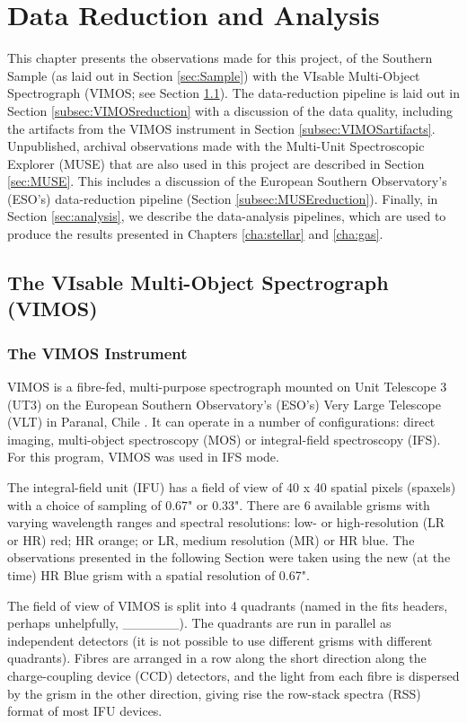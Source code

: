 \chapter{Data Reduction and Analysis}
	\label{cha:Data}
This chapter presents the observations made for this project, of the Southern Sample (as laid out in Section \ref{sec:Sample}) with the VIsable Multi-Object Spectrograph (VIMOS; see Section \ref{sec:VIMOS}). The data-reduction pipeline is laid out in Section \ref{subsec:VIMOSreduction} with a discussion of the data quality, including the artifacts from the VIMOS instrument in Section \ref{subsec:VIMOSartifacts}. Unpublished, archival observations made with the Multi-Unit Spectroscopic Explorer (MUSE) that are also used in this project are described in Section \ref{sec:MUSE}. This includes a discussion of the European Southern Observatory's (ESO's) data-reduction pipeline (Section \ref{subsec:MUSEreduction}). Finally, in Section \ref{sec:analysis}, we describe the data-analysis pipelines, which are used to produce the results presented in Chapters \ref{cha:stellar} and \ref{cha:gas}.  

\section{The VIsable Multi-Object Spectrograph (VIMOS)}
	\label{sec:VIMOS}
	\subsection{The VIMOS Instrument}
		VIMOS is a fibre-fed, multi-purpose spectrograph mounted on Unit Telescope 3 (UT3) on the European Southern Observatory's (ESO's) Very Large Telescope (VLT) in Paranal, Chile \citep{LeFevre2003}. It can operate in a number of configurations: direct imaging, multi-object spectroscopy (MOS) or integral-field spectroscopy (IFS). For this program, VIMOS was used in IFS mode. 

		The integral-field unit (IFU) has a field of view of 40 x 40 spatial pixels (spaxels) with a choice of sampling of 0.67" or 0.33". There are 6 available grisms with varying wavelength ranges and spectral resolutions: low- or high-resolution (LR or HR) red; HR orange; or LR, medium resolution (MR) or HR blue. The observations presented in the following Section were taken using the new (at the time) HR Blue grism with a spatial resolution of 0.67". 

		The field of view of VIMOS is split into 4 quadrants (named in the fits headers, perhaps unhelpfully, \_\_\_\_\_\_). The quadrants are run in parallel as independent detectors (it is not possible to use different grisms with different quadrants). Fibres are arranged in a row along the short direction along the charge-coupling device (CCD) detectors, and the light from each fibre is dispersed by the grism in the other direction, giving rise the row-stack spectra (RSS) format of most IFU devices.

